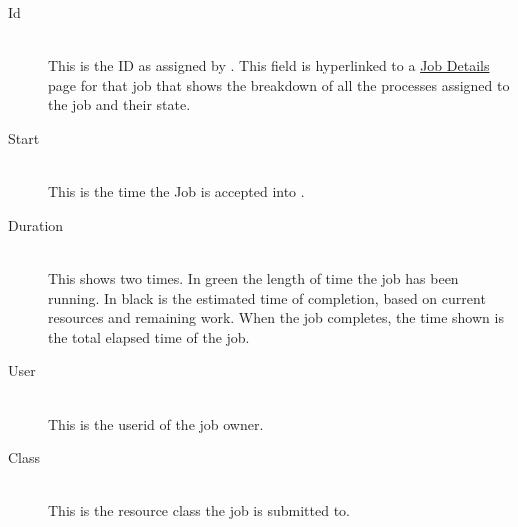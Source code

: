         \begin{description}

            \item[Id] \hfill \\
              This is the ID as assigned by {\DUCC}. This field is hyperlinked to a
              \hyperref[sec:ws-job-details]{Job Details} page for that job that shows the breakdown of
              all the processes assigned to the job and their state.
              
            \item[Start] \hfill \\
              This is the time the Job is accepted into {\DUCC}.
              
            \item[Duration] \hfill \\
              This shows two times.  In green the length of time the job has been running.  In black is
              the estimated time of completion, based on current resources and remaining work.  When
              the job completes, the time shown is the total elapsed time of the job.
                            
            \item[User] \hfill \\
              This is the userid of the job owner.
              
            \item[Class] \hfill \\
              This is the resource class the job is submitted to.
              

\end{description}
